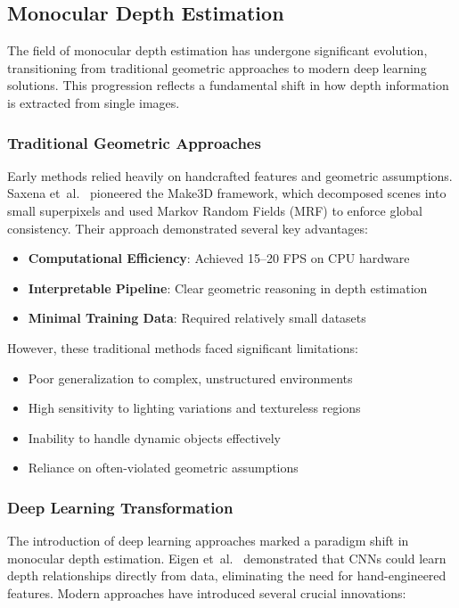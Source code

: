 \documentclass[12pt,oneside]{book}
\begin{document}
\subsection{Monocular Depth Estimation}

The field of monocular depth estimation has undergone significant evolution, transitioning from traditional geometric approaches to modern deep learning solutions. This progression reflects a fundamental shift in how depth information is extracted from single images.

\subsubsection{Traditional Geometric Approaches}
Early methods relied heavily on handcrafted features and geometric assumptions. Saxena et~al.~\cite{saxena2009make3d} pioneered the Make3D framework, which decomposed scenes into small superpixels and used Markov Random Fields (MRF) to enforce global consistency. Their approach demonstrated several key advantages:

\begin{itemize}
    \item \textbf{Computational Efficiency}: Achieved 15--20 FPS on CPU hardware
    \item \textbf{Interpretable Pipeline}: Clear geometric reasoning in depth estimation
    \item \textbf{Minimal Training Data}: Required relatively small datasets
\end{itemize}

However, these traditional methods faced significant limitations:
\begin{itemize}
    \item Poor generalization to complex, unstructured environments
    \item High sensitivity to lighting variations and textureless regions
    \item Inability to handle dynamic objects effectively
    \item Reliance on often-violated geometric assumptions
\end{itemize}

\subsubsection{Deep Learning Transformation}
The introduction of deep learning approaches marked a paradigm shift in monocular depth estimation. Eigen et~al.~\cite{eigen2014depth} demonstrated that CNNs could learn depth relationships directly from data, eliminating the need for hand-engineered features. Modern approaches have introduced several crucial innovations:
\end{document}
